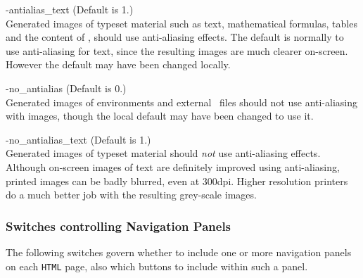 \begin{htmllist}
\begin{changebar}
%
\item [ -antialias\_text\label{aaliastext}]
 (Default is 1.)\\
Generated images of typeset material such as text, mathematical formulas,
tables and the content of  ,
should use anti-aliasing effects.\html{\\}
The default is normally to use anti-aliasing for text,
since the resulting images are much clearer on-screen.
However the default may have been changed locally.


%
\item [ -no\_antialias\label{noaalias}]
 (Default is 0.)\\
Generated images of  environments and external \PS\ files
should not use anti-aliasing with images,
though the local default may have been changed to use it.


%
\item [ -no\_antialias\_text\label{noaaliastext}]
 (Default is 1.)\\
Generated images of typeset material should \emph{not} use anti-aliasing effects.
Although on-screen images of text are definitely improved using anti-aliasing,
printed images can be badly blurred, even at 300dpi.
Higher resolution printers do a much better job with the resulting grey-scale images.
\end{changebar}
%
\end{htmllist}


\subsubsection{Switches controlling Navigation Panels\label{navoptions}}
%
The following switches govern whether to include one or more navigation
panels on each \texttt{HTML} page,
also which buttons to include within such a panel.

